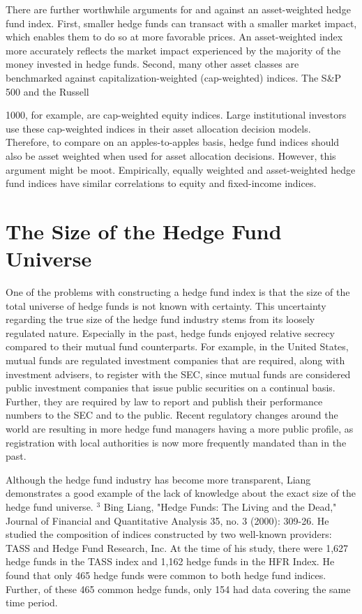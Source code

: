 \documentclass[11pt]{article}
\begin{document}
There are further worthwhile arguments for and against an asset-weighted hedge fund index. First, smaller hedge funds can transact with a smaller market impact, which enables them to do so at more favorable prices. An asset-weighted index more accurately reflects the market impact experienced by the majority of the money invested in hedge funds. Second, many other asset classes are benchmarked against capitalization-weighted (cap-weighted) indices. The S\&P 500 and the Russell

1000, for example, are cap-weighted equity indices. Large institutional investors use these cap-weighted indices in their asset allocation decision models. Therefore, to compare on an apples-to-apples basis, hedge fund indices should also be asset weighted when used for asset allocation decisions. However, this argument might be moot. Empirically, equally weighted and asset-weighted hedge fund indices have similar correlations to equity and fixed-income indices.

\section*{The Size of the Hedge Fund Universe}
One of the problems with constructing a hedge fund index is that the size of the total universe of hedge funds is not known with certainty. This uncertainty regarding the true size of the hedge fund industry stems from its loosely regulated nature. Especially in the past, hedge funds enjoyed relative secrecy compared to their mutual fund counterparts. For example, in the United States, mutual funds are regulated investment companies that are required, along with investment advisers, to register with the SEC, since mutual funds are considered public investment companies that issue public securities on a continual basis. Further, they are required by law to report and publish their performance numbers to the SEC and to the public. Recent regulatory changes around the world are resulting in more hedge fund managers having a more public profile, as registration with local authorities is now more frequently mandated than in the past.

Although the hedge fund industry has become more transparent, Liang demonstrates a good example of the lack of knowledge about the exact size of the hedge fund universe. $^{3}$ Bing Liang, "Hedge Funds: The Living and the Dead," Journal of Financial and Quantitative Analysis 35, no. 3 (2000): 309-26. He studied the composition of indices constructed by two well-known providers: TASS and Hedge Fund Research, Inc. At the time of his study, there were 1,627 hedge funds in the TASS index and 1,162 hedge funds in the HFR Index. He found that only 465 hedge funds were common to both hedge fund indices. Further, of these 465 common hedge funds, only 154 had data covering the same time period.
\end{document}
